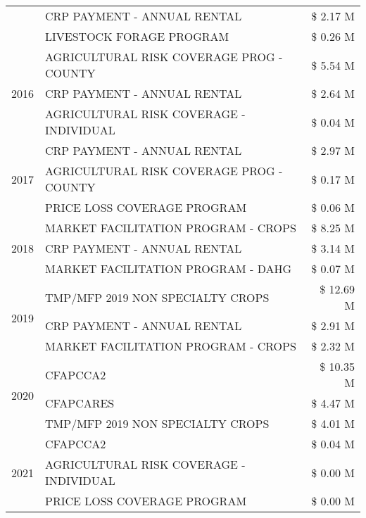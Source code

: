 \begin{tabular}{llr}
 & CRP PAYMENT - ANNUAL RENTAL & \$ 2.17 M \\
 & LIVESTOCK FORAGE PROGRAM & \$ 0.26 M \\
\cline{1-3}
\multirow[t]{3}{*}{2016} & AGRICULTURAL RISK COVERAGE PROG - COUNTY & \$ 5.54 M \\
 & CRP PAYMENT - ANNUAL RENTAL & \$ 2.64 M \\
 & AGRICULTURAL RISK COVERAGE - INDIVIDUAL & \$ 0.04 M \\
\cline{1-3}
\multirow[t]{3}{*}{2017} & CRP PAYMENT - ANNUAL RENTAL & \$ 2.97 M \\
 & AGRICULTURAL RISK COVERAGE PROG - COUNTY & \$ 0.17 M \\
 & PRICE LOSS COVERAGE PROGRAM & \$ 0.06 M \\
\cline{1-3}
\multirow[t]{3}{*}{2018} & MARKET FACILITATION PROGRAM - CROPS & \$ 8.25 M \\
 & CRP PAYMENT - ANNUAL RENTAL & \$ 3.14 M \\
 & MARKET FACILITATION PROGRAM - DAHG & \$ 0.07 M \\
\cline{1-3}
\multirow[t]{3}{*}{2019} & TMP/MFP 2019 NON SPECIALTY CROPS & \$ 12.69 M \\
 & CRP PAYMENT - ANNUAL RENTAL & \$ 2.91 M \\
 & MARKET FACILITATION PROGRAM - CROPS & \$ 2.32 M \\
\cline{1-3}
\multirow[t]{3}{*}{2020} & CFAPCCA2 & \$ 10.35 M \\
 & CFAPCARES & \$ 4.47 M \\
 & TMP/MFP 2019 NON SPECIALTY CROPS & \$ 4.01 M \\
\cline{1-3}
\multirow[t]{3}{*}{2021} & CFAPCCA2 & \$ 0.04 M \\
 & AGRICULTURAL RISK COVERAGE - INDIVIDUAL & \$ 0.00 M \\
 & PRICE LOSS COVERAGE PROGRAM & \$ 0.00 M \\
\cline{1-3}
\bottomrule
\end{tabular}
